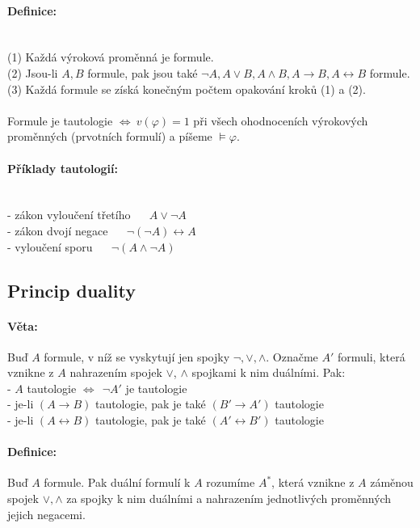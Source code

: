 \documentclass[a4]{report}
\theoremstyle{definition}
\begin{document}
\paragraph*{Definice:} ~\\
(1) Každá výroková proměnná je formule.\\
(2) Jsou-li $A, B$ formule, pak jsou také $ \neg A, A \vee B, A \wedge B, A \rightarrow B, A \leftrightarrow B $ formule.\\
(3) Každá formule se získá konečným počtem opakování kroků (1) a (2).\\
~\\
Formule je tautologie $\Leftrightarrow ~ v(\varphi ) = 1$ při všech ohodnoceních výrokových proměnných (prvotních formulí) a píšeme $\models \varphi $.
%
\paragraph*{Příklady tautologií:}~\\
- zákon vyloučení třetího ~~ $ A \vee \neg A $\\
- zákon dvojí negace ~~ $ \neg ( \neg A) \leftrightarrow A$\\
- vyloučení sporu ~~ $ \neg ( A \wedge \neg A ) $
\subsection*{Princip duality}
\paragraph*{Věta:}
Buď $A$ formule, v níž se vyskytují jen spojky $\neg , \vee , \wedge $.
Označme $ A ' $ formuli, která vznikne z $A$ nahrazením spojek $ \vee $, $ \wedge $
spojkami k nim duálními. Pak:\\
- $A$ tautologie $ \Leftrightarrow ~~ \neg A ' $ je tautologie\\
- je-li $(A \rightarrow B)$ tautologie, pak je také $(B' \rightarrow A')$ tautologie\\
- je-li $(A \leftrightarrow B)$ tautologie, pak je také $(A' \leftrightarrow B')$ tautologie

\paragraph*{Definice:}
Buď $A$ formule. Pak duální formulí k $A$ rozumíme $A^*$, která vznikne z $A$ záměnou spojek $ \vee , \wedge $ za spojky k nim duálními a nahrazením jednotlivých proměnných jejich negacemi.
\end{document}
